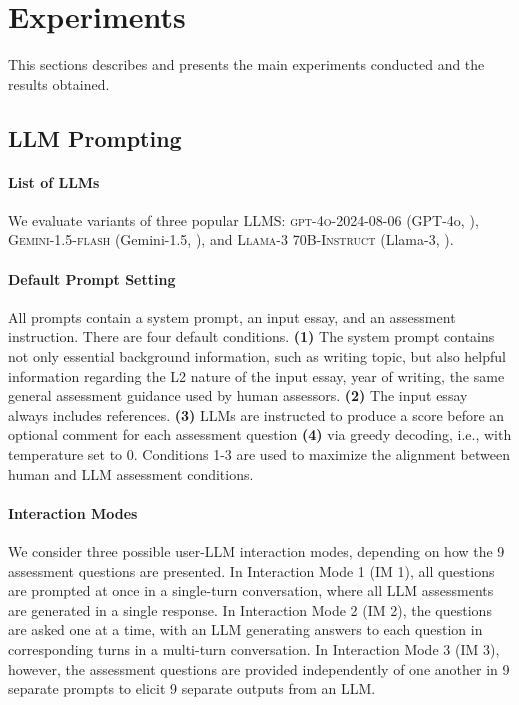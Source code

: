 \section{Experiments\label{sec:experiments}}

This sections describes and presents the main experiments conducted and the results obtained.


\subsection{LLM Prompting\label{sec:prompting}}

\paragraph{List of LLMs} We evaluate variants of three popular LLMS: \textsc{gpt-4o-2024-08-06} (GPT-4o, \citealp{openai2024gpt4ocard}), \textsc{Gemini-1.5-flash} (Gemini-1.5, \citealp{geminiteam2024gemini15}), and \textsc{Llama-3 70B-Instruct} (Llama-3, \citealp{grattafiori2024llama3herdmodels}).%

\paragraph{Default Prompt Setting} All prompts contain a system prompt, an input essay, and an assessment instruction. There are four default conditions. \textbf{(1)} The system prompt contains not only essential background information, such as writing topic, but also helpful information regarding the L2 nature of the input essay, year of writing, the same general assessment guidance used by human assessors. \textbf{(2)} The input essay always includes references. \textbf{(3)} LLMs are instructed to produce a score before an optional comment for each assessment question \textbf{(4)} via greedy decoding, i.e., with temperature set to 0. Conditions 1-3 are used to maximize the alignment between human and LLM assessment conditions.


\paragraph{Interaction Modes} We consider three possible user-LLM interaction modes, depending on how the 9 assessment questions are presented. In Interaction Mode 1 (IM 1), all questions are prompted at once in a single-turn conversation, where all LLM assessments are generated in a single response. In Interaction Mode 2 (IM 2), the questions are asked one at a time, with an LLM generating answers to each question in corresponding turns in a multi-turn conversation. In Interaction Mode 3 (IM 3), however, the assessment questions are provided independently of one another in 9 separate prompts to elicit 9 separate outputs from an LLM.





